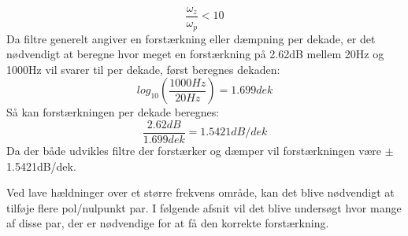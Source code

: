 %
\begin{equation}
	\frac{\omega_z}{\omega_p} < 10
\end{equation}
%
Da filtre generelt angiver en forstærkning eller dæmpning per dekade, er det nødvendigt at beregne hvor meget en forstærkning på 2.62dB mellem 20Hz og 1000Hz vil svarer til per dekade, først beregnes dekaden:
%
\begin{equation}
	log_{10}\left(\frac{1000Hz}{20Hz}\right) = 1.699dek
\end{equation}
%
Så kan forstærkningen per dekade beregnes: 
%
\begin{equation}
	\frac{2.62dB}{1.699dek} = 1.5421dB/dek
\end{equation}
%
Da der både udvikles filtre der forstærker og dæmper vil forstærkningen være $\pm$1.5421dB/dek. 

Ved lave hældninger over et større frekvens område, kan det blive nødvendigt at tilføje flere pol/nulpunkt par. I følgende afsnit vil det blive undersøgt hvor mange af disse par, der er nødvendige for at få den korrekte forstærkning. 